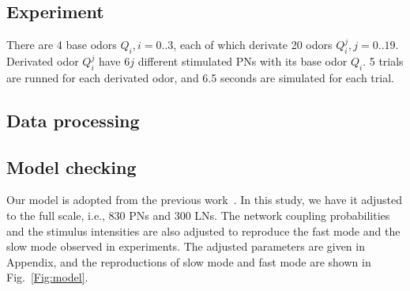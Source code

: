 \documentclass[12pt, a4paper]{article}
\begin{document}

\subsection*{Experiment} \label{Sect:experiment}
There are 4 base odors $Q_i, i=0..3$, each of which derivate 20 odors $Q_i^j, j=0..19$. Derivated odor $Q_i^j$ have $6j$ different stimulated PNs with its base odor $Q_i$. 5 trials are runned for each derivated odor, and 6.5 seconds are simulated for each trial.

\subsection*{Data processing} \label{Sect:data_proc}
 \cdots

\subsection*{Model checking} \label{Sect:model_checking}

Our model is adopted from the previous work~\citep{Patel2009, Patel2013}. In this study, we have it adjusted to the full scale, i.e., 830 PNs and 300 LNs. The network coupling probabilities and the stimulus intensities are also adjusted to reproduce the fast mode and the slow mode observed in experiments. The adjusted parameters are given in Appendix, and the reproductions of slow mode and fast mode are shown in Fig.~\ref{Fig:model}.
\end{document}
